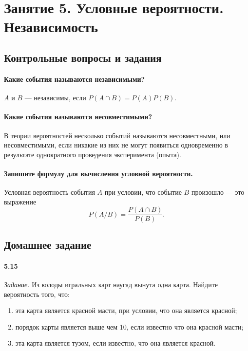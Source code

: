\chapter*{Занятие 5. Условные вероятности. Независимость}

\section*{Контрольные вопросы и задания}

\subsubsection*{Какие события называются независимыми?}

$A$ и $B$ --- независимы, если $P \left( A \cap B \right) = P \left( A \right) P \left( B \right) $.

\subsubsection*{Какие события называются несовместимыми?}

В теории вероятностей несколько событий называются несовместными, или несовместимыми, если никакие из них не могут появиться одновременно в результате однократного проведения эксперимента (опыта).

\subsubsection*{Запишите формулу для вычисления условной вероятности.}

Условная вероятность события $A$ при условии, что событие $B$ произошло --- это выражение
$$P \left( A/B \right) =
\frac{P \left( A \cap B \right) }{P \left( B \right) }.$$

\section*{Домашнее задание}

\subsubsection*{5.15}

\textit{Задание.} Из колоды игральных карт наугад вынута одна карта.
Найдите вероятность того, что:
\begin{enumerate}[label=\alph*)]
\item эта карта является красной масти, при условии, что она является красной;
\item порядок карты является выше чем 10, если известно что она красной масти;
\item эта карта является тузом, если известно, что она является красной.
\end{enumerate}

